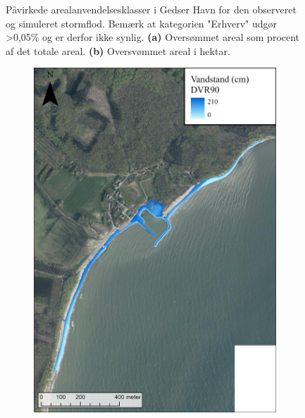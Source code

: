\begin{figure}[H]
\begin{subfigure}[b]{0.5\textwidth}
        \caption{}
        \label{Subfig: Hektar areal Gedser}
    \end{subfigure}
    \caption{Påvirkede arealanvendelsesklasser i Gedser Havn for den observeret og simuleret stormflod. Bemærk at kategorien "Erhverv" \hspace{0.1cm}udgør >0,05\% og er derfor ikke synlig. \textbf{(a)} Oversømmet areal som procent af det totale areal. \textbf{(b)} Oversvømmet areal i hektar.}
    \label{Figur: Påvirket arealanvendelse Gedser}
\end{figure}



\begin{figure}[H]
    \begin{subfigure}[t]{0.5\textwidth}
        \centering
        \includegraphics[width=0.95\linewidth]{images/Resultater/2023Malt/2023 resultat_hesnaes.jpg}
        \caption{}
        \label{Subfig: Målt Hesnæs}
    \end{subfigure}

\end{figure}

